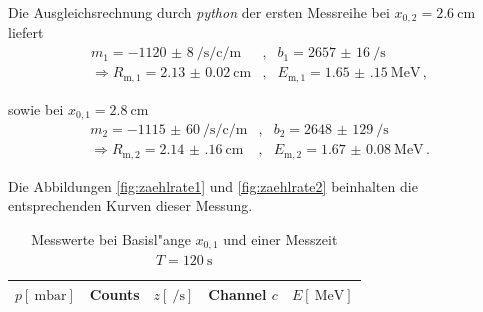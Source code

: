 		\clearpage
		Die Ausgleichsrechnung durch \emph{python} der ersten Messreihe bei $x_{0,2} = \SI{2.6}{\centi \meter}$ liefert
		\begin{eqnarray*}
			m_1 = \SI{-1120(8)}{\per \second \per \centi \per \meter} &,& b_1 = \SI{2657(16)}{\per \second} \\
			\Rightarrow R_\mathrm{m,1} = \SI{2.13(2)}{\centi \meter} &,& E_\mathrm{m,1} = \SI{1.65(15)}{\mega \electronvolt} \,,
		\end{eqnarray*}

		sowie bei $x_{0,1} = \SI{2.8}{\centi \meter}$
		\begin{eqnarray*}
			m_2 = \SI{-1115(60)}{\per \second \per \centi \per \meter} &,& b_2 = \SI{2648(129)}{\per \second} \\
			\Rightarrow R_\mathrm{m,2} = \SI{2.14(16)}{\centi \meter} &,& E_\mathrm{m,2} = \SI{1.67(8)}{\mega \electronvolt} \,.
		\end{eqnarray*}

		Die Abbildungen \ref{fig:zaehlrate1} und \ref{fig:zaehlrate2} beinhalten die entsprechenden Kurven dieser Messung.

		\begin{table}[h!]
			\begin{center}
				\caption{Messwerte bei Basisl"ange $x_{0,1}$ und einer Messzeit $T = \SI{120}{\second}$ \label{table:messung1-1}}
				\begin{tabular}{|r|r|r|r|r|}
					\hline
						\multicolumn{1}{|c|}{$p [\SI{}{\milli \bar}]$}& 
						\multicolumn{1}{c|}{Counts} & 
						\multicolumn{1}{c|}{$z \left[\SI{}{\per \second}\right]$} & 
						\multicolumn{1}{c|}{Channel $c$} & 
						\multicolumn{1}{c|}{$E [\SI{}{\mega \electronvolt}]$} \\
					\hline 
					\hline
						
					\hline 
				\end{tabular}
			\end{center}
		\end{table}

